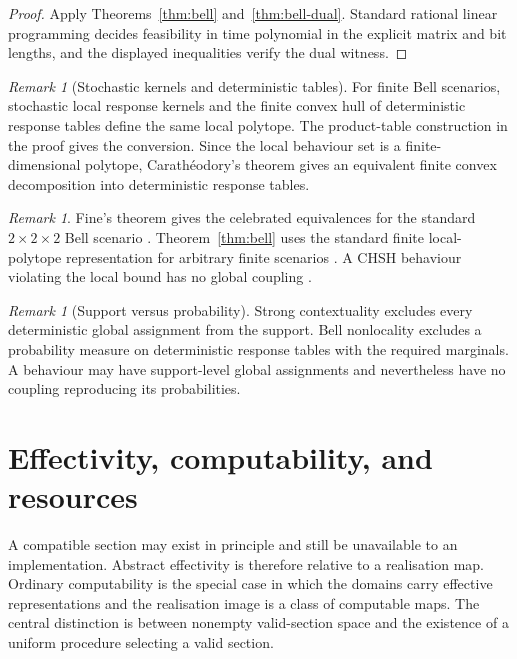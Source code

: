 \documentclass[11pt]{article}
\theoremstyle{plain}
\theoremstyle{definition}
\theoremstyle{remark}
\newtheorem{remark}[theorem]{Remark}
\begin{document}
\begin{proof}
Apply Theorems~\ref{thm:bell} and~\ref{thm:bell-dual}. Standard rational linear
programming decides feasibility in time polynomial in the explicit matrix and
bit lengths, and the displayed inequalities verify the dual witness.
\end{proof}

\begin{remark}[Stochastic kernels and deterministic tables]
For finite Bell scenarios, stochastic local response kernels and the finite
convex hull of deterministic response tables define the same local polytope. The
product-table construction in the proof gives the conversion. Since the local
behaviour set is a finite-dimensional polytope, Carath\'eodory's theorem gives
an equivalent finite convex decomposition into deterministic response tables.
\end{remark}

\begin{remark}
Fine's theorem gives the celebrated equivalences for the standard
$2\times2\times2$ Bell scenario \cite{fine}. Theorem~\ref{thm:bell} uses the
standard finite local-polytope representation for arbitrary finite scenarios
\cite{pitowsky}. A CHSH behaviour violating the local bound has no global coupling
\cite{chsh}.
\end{remark}

\begin{remark}[Support versus probability]
Strong contextuality excludes every deterministic global assignment from the
support. Bell nonlocality excludes a probability measure on deterministic
response tables with the required marginals. A behaviour may have support-level
global assignments and nevertheless have no coupling reproducing its
probabilities.
\end{remark}

\section{Effectivity, computability, and resources}\label{sec:effect}

A compatible section may exist in principle and still be unavailable to an
implementation. Abstract effectivity is therefore relative to a realisation map.
Ordinary computability is the special case in which the domains carry effective
representations and the realisation image is a class of computable maps. The
central distinction is between nonempty valid-section space and the existence of
a uniform procedure selecting a valid section.
\end{document}
